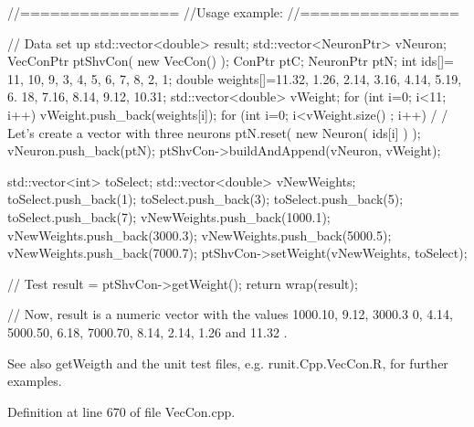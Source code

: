 \begin{DoxyCode}
        //================
        //Usage example:
        //================

        // Data set up
                std::vector<double> result;
                        std::vector<NeuronPtr> vNeuron;
                        VecConPtr       ptShvCon( new VecCon() );
                        ConPtr  ptC;
                        NeuronPtr ptN;
                        int ids[]= {11, 10, 9, 3, 4, 5, 6, 7, 8, 2, 1};
                        double weights[]={11.32, 1.26, 2.14, 3.16, 4.14, 5.19, 6.
      18, 7.16, 8.14, 9.12, 10.31};
                        std::vector<double> vWeight;
                        for (int i=0; i<11; i++) {
                        vWeight.push_back(weights[i]);
                        }
                        for (int i=0; i<vWeight.size() ; i++) {                         /
      / Let's create a vector with three neurons
                        ptN.reset( new Neuron( ids[i] ) );
                        vNeuron.push_back(ptN);
                        }
                        ptShvCon->buildAndAppend(vNeuron, vWeight);

                        std::vector<int> toSelect;
                        std::vector<double> vNewWeights;
                        toSelect.push_back(1);
                        toSelect.push_back(3);
                        toSelect.push_back(5);
                        toSelect.push_back(7);
                        vNewWeights.push_back(1000.1);
                        vNewWeights.push_back(3000.3);
                        vNewWeights.push_back(5000.5);
                        vNewWeights.push_back(7000.7);
                        ptShvCon->setWeight(vNewWeights, toSelect);

        // Test
                        result = ptShvCon->getWeight();
                        return wrap(result);

        // Now, result is a numeric vector with the values  1000.10, 9.12, 3000.3
      0, 4.14, 5000.50, 6.18, 7000.70, 8.14, 2.14, 1.26 and 11.32 .
\end{DoxyCode}


\begin{DoxySeeAlso}{See also}
getWeigth and the unit test files, e.g. runit.Cpp.VecCon.R, for further examples. 
\end{DoxySeeAlso}


Definition at line 670 of file VecCon.cpp.



